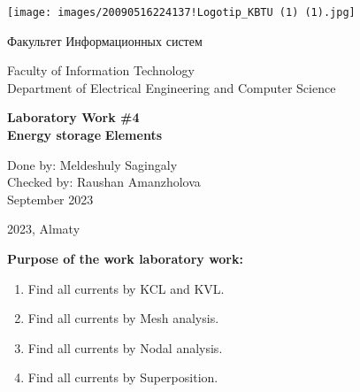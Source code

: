 \documentclass{article}
\begin{document}
\begin{titlepage}
    \centering
    \texttt{[image: images/20090516224137!Logotip\_KBTU (1) (1).jpg]}
    
    \vspace{0cm} %
    {\fontsize{40}{48}\selectfont Факультет Информационных систем} %
    
    \vspace{0.1cm} %
    
    \begin{center} %
        Faculty of Information Technology\\
        Department of Electrical Engineering and Computer Science
    \end{center}
    
    \vfill %
    
    {\LARGE\bfseries Laboratory Work \#4}\\
    {\LARGE\bfseries Energy storage}
    {\LARGE\bfseries Elements}
    \vspace{4cm} %
    
    \begin{flushright}
        Done by: Meldeshuly Sagingaly \\
        Checked by: Raushan Amanzholova \\
        September 2023
    \end{flushright}
    
    \vfill %
    \begin{center}
        2023, Almaty
    \end{center}
    
\end{titlepage}



\begin{flushleft}
\textbf{Purpose of the work laboratory work:}
\end{flushleft}
\begin{enumerate}
    \item Find all currents by KCL and KVL.
    \item Find all currents by Mesh analysis.
    \item Find all currents by Nodal analysis.
    \item Find all currents by Superposition.
\end{enumerate}
\end{document}
